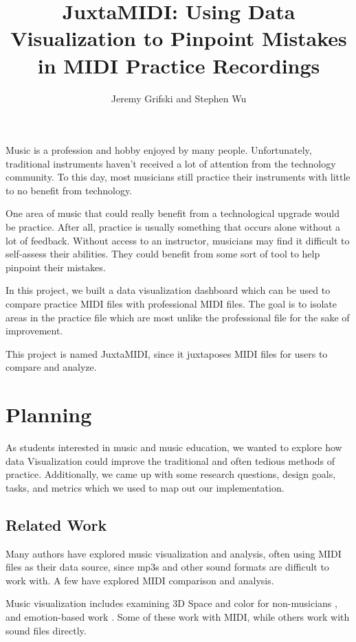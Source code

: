 \documentclass[journal]{vgtc}                %
\title{JuxtaMIDI: Using Data Visualization to Pinpoint Mistakes in MIDI Practice Recordings}
\author{Jeremy Grifski and Stephen Wu}
\begin{document}

\maketitle

Music is a profession and hobby enjoyed by many people. Unfortunately, traditional
instruments haven't received a lot of attention from the technology community. To
this day, most musicians still practice their instruments with little to no
benefit from technology.

One area of music that could really benefit from a technological upgrade would
be practice. After all, practice is usually something that occurs alone without
a lot of feedback. Without access to an instructor, musicians may find it difficult
to self-assess their abilities. They could benefit from some sort of tool
to help pinpoint their mistakes.

In this project, we built a data visualization dashboard which can be used to
compare practice MIDI files with professional MIDI files. The goal is to isolate
areas in the practice file which are most unlike the professional file for the
sake of improvement.

This project is named JuxtaMIDI, since it juxtaposes MIDI files
for users to compare and analyze.

\section{Planning}

As students interested in music and music education, we wanted to explore how data Visualization
could improve the traditional and often tedious methods of practice. Additionally, we came up with some
research questions, design goals, tasks, and metrics which we used to map
out our implementation.

\subsection{Related Work}

Many authors have explored music visualization and analysis, often using MIDI files
as their data source, since mp3s and other sound formats are difficult to work with. A few have explored MIDI comparison and analysis.

Music visualization includes examining 3D Space and color for non-musicians \cite{visualization},
and emotion-based work \cite{emotion}. Some of these work with MIDI, while others work with sound files directly.
\end{document}
